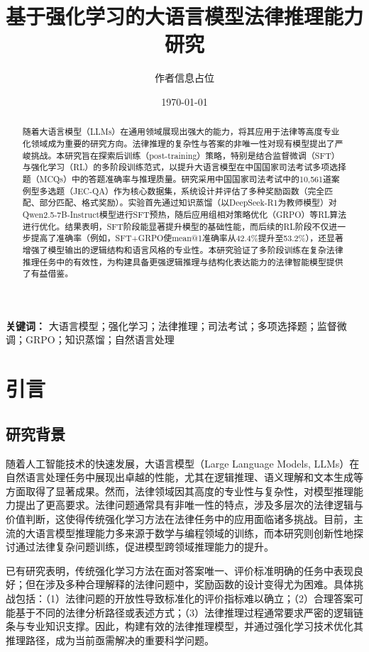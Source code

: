 \documentclass{article}
\begin{document}
\title{基于强化学习的大语言模型法律推理能力研究}
\author{作者信息占位} %
\date{\today}
\maketitle

\begin{abstract}
随着大语言模型（LLMs）在通用领域展现出强大的能力，将其应用于法律等高度专业化领域成为重要的研究方向。法律推理的复杂性与答案的非唯一性对现有模型提出了严峻挑战。本研究旨在探索后训练（post-training）策略，特别是结合监督微调（SFT）与强化学习（RL）的多阶段训练范式，以提升大语言模型在中国国家司法考试多项选择题（MCQs）中的答题准确率与推理质量。研究采用中国国家司法考试中的10,561道案例型多选题（JEC-QA）作为核心数据集，系统设计并评估了多种奖励函数（完全匹配、部分匹配、格式奖励）。实验首先通过知识蒸馏（以DeepSeek-R1为教师模型）对Qwen2.5-7B-Instruct模型进行SFT预热，随后应用组相对策略优化（GRPO）等RL算法进行优化。结果表明，SFT阶段能显著提升模型的基础性能，而后续的RL阶段不仅进一步提高了准确率（例如，SFT+GRPO使mean@1准确率从42.4\%提升至53.2\%），还显著增强了模型输出的逻辑结构和语言风格的专业性。本研究验证了多阶段训练在复杂法律推理任务中的有效性，为构建具备更强逻辑推理与结构化表达能力的法律智能模型提供了有益借鉴。
\end{abstract}

\textbf{关键词：} 大语言模型；强化学习；法律推理；司法考试；多项选择题；监督微调；GRPO；知识蒸馏；自然语言处理

\tableofcontents
\newpage

\section{引言}

\subsection{研究背景}

随着人工智能技术的快速发展，大语言模型（Large Language Models, LLMs）在自然语言处理任务中展现出卓越的性能，尤其在逻辑推理、语义理解和文本生成等方面取得了显著成果。然而，法律领域因其高度的专业性与复杂性，对模型推理能力提出了更高要求。法律问题通常具有非唯一性的特点，涉及多层次的法律逻辑与价值判断，这使得传统强化学习方法在法律任务中的应用面临诸多挑战。目前，主流的大语言模型推理能力多来源于数学与编程领域的训练，而本研究则创新性地探讨通过法律复杂问题训练，促进模型跨领域推理能力的提升。

已有研究表明，传统强化学习方法在面对答案唯一、评价标准明确的任务中表现良好；但在涉及多种合理解释的法律问题中，奖励函数的设计变得尤为困难。具体挑战包括：（1）法律问题的开放性导致标准化的评价指标难以确立；（2）合理答案可能基于不同的法律分析路径或表述方式；（3）法律推理过程通常要求严密的逻辑链条与专业知识支撑。因此，构建有效的法律推理模型，并通过强化学习技术优化其推理路径，成为当前亟需解决的重要科学问题。
\end{document}
